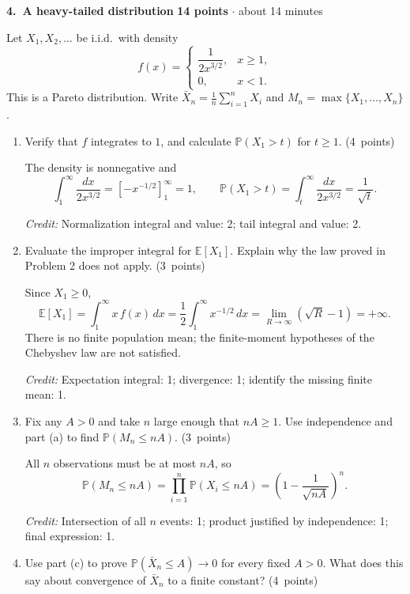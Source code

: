 \documentclass[11pt,letterpaper]{article}
\newcommand{\Prob}{\mathbb P}
\newcommand{\E}{\mathbb E}
\newcommand{\partpts}[1]{\unskip\nobreak\hspace{.3em}%
  \mbox{\small\color{muted}(#1 points)}}
\newcommand{\credit}[1]{\par{\footnotesize\color{muted}\textit{Credit:} #1}}
\newcommand{\problem}[4]{\par\addvspace{8pt}%
  {\large\bfseries\color{indigo}#1.\ #2}\hfill
  {\small\color{muted}\textbf{#3 points} $\cdot$ about #4 minutes}\par\nobreak}
\begin{document}
\newpage
\problem{4}{A heavy-tailed distribution}{14}{14}
Let $X_1,X_2,\ldots$ be i.i.d.\ with density
\[
  f(x)=\begin{cases}
    \dfrac{1}{2x^{3/2}},&x\ge1,\\[4pt]
    0,&x<1.
  \end{cases}
\]
This is a Pareto distribution. Write
$\bar X_n=\frac1n\sum_{i=1}^n X_i$ and
$M_n=\max\{X_1,\ldots,X_n\}$.
\begin{enumerate}
  \item Verify that $f$ integrates to $1$, and calculate
  $\Prob(X_1>t)$ for $t\ge1$. \partpts{4}
  \begin{solution}[.8in]
    The density is nonnegative and
    \[
      \int_1^\infty\frac{dx}{2x^{3/2}}
        =[-x^{-1/2}]_1^\infty=1,
      \qquad
      \Prob(X_1>t)=\int_t^\infty\frac{dx}{2x^{3/2}}
        =\frac1{\sqrt t}.
    \]
    \credit{Normalization integral and value: 2; tail integral and value: 2.}
  \end{solution}

  \item Evaluate the improper integral for $\E[X_1]$.
  Explain why the law proved in Problem 2 does not apply.
  \partpts{3}
  \begin{solution}[.85in]
    Since $X_1\ge0$,
    \[
      \E[X_1]=\int_1^\infty x\,f(x)\,dx
        =\frac12\int_1^\infty x^{-1/2}\,dx
        =\lim_{R\to\infty}(\sqrt R-1)=+\infty.
    \]
    There is no finite population mean; the finite-moment hypotheses
    of the Chebyshev law are not satisfied.
    \credit{Expectation integral: 1; divergence: 1;
    identify the missing finite mean: 1.}
  \end{solution}

  \item Fix any $A>0$ and take $n$ large enough that $nA\ge1$.
  Use independence and part (a) to find $\Prob(M_n\le nA)$.
  \partpts{3}
  \begin{solution}[.85in]
    All $n$ observations must be at most $nA$, so
    \[
      \Prob(M_n\le nA)
        =\prod_{i=1}^n\Prob(X_i\le nA)
        =\left(1-\frac1{\sqrt{nA}}\right)^n.
    \]
    \credit{Intersection of all $n$ events: 1;
    product justified by independence: 1; final expression: 1.}
  \end{solution}

  \item Use part (c) to prove
  $\Prob(\bar X_n\le A)\to0$ for every fixed $A>0$.
  What does this say about convergence of $\bar X_n$ to a finite constant?
  \partpts{4}


\end{enumerate}
\end{document}
